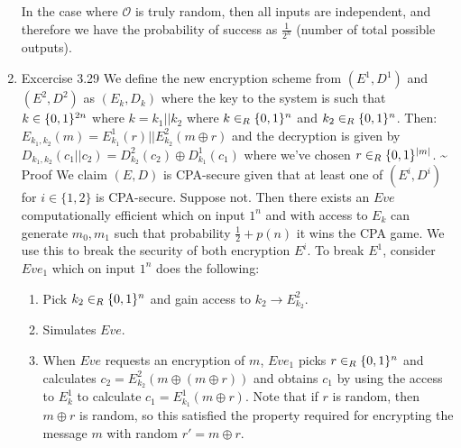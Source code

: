 \documentclass{article}
\begin{document}
\begin{enumerate}
In the case where $\mathcal{O}$ is truly random, then all inputs are independent, and therefore
we have the probability of success as $\frac{1}{2^n}$ (number of total possible outputs).%

\item{}
Excercise 3.29
We define the new encryption scheme from $(E^1,D^1)$ and $(E^2,D^2)$ as $(E_k,D_k)$ where the
key to the system is such that $k \in \{0,1\}^{2n}$ where $k = k_1 || k_2$ where $k \in_R \{0,1\}^{n}$ and
$k_2 \in_R \{0,1\}^n$. Then: 
$E_{k_1,k_2}(m) = E_{k_1}^1(r) || E^2_{k_2}(m \oplus r)$ and the decryption is given by
$D_{k_1,k_2}(c_1 || c_2) =D^2_{k_2}(c_2) \oplus D_{k_1}^1(c_1)$ where we've chosen $r \in_R \{0,1\}^{|m|}$.
\textasciitilde{} Proof
We claim $(E,D)$ is CPA-secure given that at least one of $(E^i,D^i)$ for $i \in \{1,2\}$ is CPA-secure.
Suppose not. Then there exists an $Eve$ computationally efficient which on input $1^n$ and with 
access to $E_k$ can generate $m_0,m_1$ such that probability $\frac{1}{2} + p(n)$ it wins the
CPA game. We use this to break the security of both encryption $E^i$. To break $E^1$, consider
$Eve_1$ which on input $1^n$ does the following:%

\begin{enumerate}[noitemsep,topsep=\mdcompacttopsep,start=0]%

\item{}Pick $k_2 \in_R \{0,1\}^n$ and gain access to $k_2 \to E^2_{k_2}$.%

\item{}Simulates $Eve$.%

\item{}When $Eve$ requests an encryption of $m$, $Eve_1$ picks $r \in_R \{0,1\}^{n}$ and calculates
$c_2 = E^2_{k_2}(m \oplus (m \oplus r))$ and obtains $c_1$ by using the access to $E^1_k$ to calculate 
$c_1 = E^1_{k_1}(m \oplus r)$. Note that if $r$ is random, then $m \oplus r$ is random, so this
satisfied the property required for encrypting the message $m$ with random $r' = m \oplus r$.%


\end{enumerate}
\end{enumerate}
\end{document}

